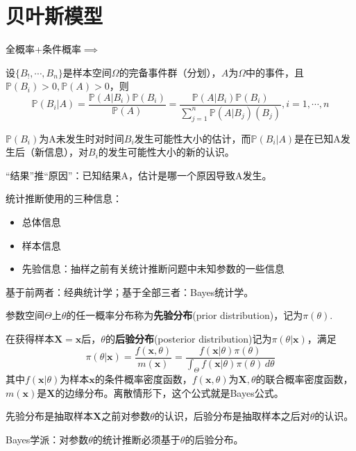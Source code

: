 \documentclass{ctexbook}
\begin{document}
\section{贝叶斯模型}

全概率+条件概率$\implies$
\begin{theorem}
    设$\{B_!,\cdots,B_n\}$是样本空间$\Omega$的完备事件群（分划），$A$为$\Omega$中的事件，且$\mathbb{P}(B_i)>0,\mathbb{P} (A)>0$，则
    $$\mathbb{P}(B_i|A)=\frac{\mathbb{P} (A|B_i)\mathbb{P} (B_i)}{\mathbb{P} (A)}=\frac{\mathbb{P} (A|B_i)\mathbb{P} (B_i)}{\sum_{j=1}^n \mathbb{P}(A|B_j)(B_j)},i=1,\cdots,n$$
\end{theorem}
\begin{remark}
    $\mathbb{P} (B_i)$为A未发生时对时间$B_i$发生可能性大小的估计，而$\mathbb{P} (B_i|A)$是在已知A发生后（新信息），对$B_i$的发生可能性大小的新的认识。

    “结果”推“原因”：已知结果A，估计是哪一个原因导致A发生。
\end{remark}

统计推断使用的三种信息：\begin{itemize}
    \item 总体信息
    \item 样本信息
    \item 先验信息：抽样之前有关统计推断问题中未知参数的一些信息
\end{itemize}
基于前两者：经典统计学；基于全部三者：Bayes统计学。

\begin{definition}
    参数空间$\Theta$上$\theta$的任一概率分布称为\textbf{先验分布}(prior distribution)，记为$\pi(\theta)$.
\end{definition}

\begin{definition}
    在获得样本$\mathbf{X}=\mathbf{x}$后，$\theta$的\textbf{后验分布}(posterior distribution)记为$\pi(\theta|\mathbf{x})$，满足
    $$\pi(\theta|\mathbf{x})=\frac{f(\mathbf{x},\theta)}{m(\mathbf{x})}=\frac{f(\mathbf{x}|\theta)\pi(\theta)}{\int_{\Theta}f(\mathbf{x}|\theta)\pi(\theta)\,d\theta}$$
    其中$f(\mathbf{x}|\theta)$为样本$\mathbf{x}$的条件概率密度函数，$f(\mathbf{x},\theta)$为$\mathbf{X},\theta$的联合概率密度函数，$m(\mathbf{x})$是$\mathbf{X}$的边缘分布。离散情形下，这个公式就是Bayes公式。
\end{definition}
先验分布是抽取样本$\mathbf{X}$之前对参数$\theta$的认识，后验分布是抽取样本之后对$\theta$的认识。

Bayes学派：对参数$\theta$的统计推断必须基于$\theta$的后验分布。
\end{document}
